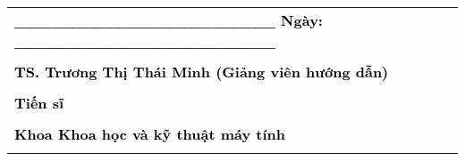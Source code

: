\begin{table}
    \centering
    \begin{tabular}{l}
        \textbf{\textcolor{black}{\_\_\_\_\_\_\_\_\_\_\_\_\_\_\_\_\_\_\_\_\_ Ngày: \_\_\_\_\_\_\_\_\_\_\_\_\_\_\_\_\_\_\_\_\_}}
        \\\\
        \textbf{\textcolor{black}{TS. Trương Thị Thái Minh (Giảng viên hướng dẫn)}}
        \\\\
        \textbf{\textcolor{black}{Tiến sĩ}}
        \\\\
        \textbf{\textcolor{black}{Khoa Khoa học và kỹ thuật máy tính}}
        \\\\
    \end{tabular}
\end{table}